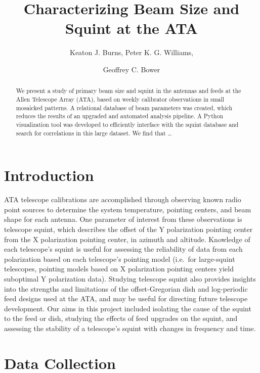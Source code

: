 \documentclass[preprint]{aastex}
\begin{document}
\title{Characterizing Beam Size and Squint at the ATA}
\author{Keaton J. Burns, Peter K. G. Williams, \and Geoffrey C. Bower}

\begin{abstract}
We present a study of primary beam size and squint in the antennas and
feeds at the Allen Telescope Array (ATA), based on weekly calibrator
observations in small mosaicked patterns. A relational database of
beam parameters was created, which reduces the results of an upgraded
and automated analysis pipeline.  A Python visualization tool was
developed to efficiently interface with the squint database and search
for correlations in this large dataset.  We find that \ldots
\end{abstract}


\section{Introduction}\label{s.intro}
ATA telescope calibrations are accomplished through observing known
radio point sources to determine the system temperature, pointing
centers, and beam shape for each antenna.  One parameter of interest
from these observations is telescope squint, which describes the
offset of the Y polarization pointing center from the X polarization
pointing center, in azimuth and altitude.  Knowledge of each
telescope's squint is useful for assessing the reliability of data
from each polarization based on each telescope's pointing model
(i.e.~for large-squint telescopes, pointing models based on X
polarization pointing centers yield suboptimal Y polarization
data). Studying telescope squint also provides insights into the
strengths and limitations of the offset-Gregorian dish and
log-periodic feed designs used at the ATA, and may be useful for
directing future telescope development.  Our aims in this project
included isolating the cause of the squint to the feed or dish,
studying the effects of feed upgrades on the squint, and assessing the
stability of a telescope's squint with changes in frequency and time.


\section{Data Collection}\label{s.datacollection}
\end{document}
